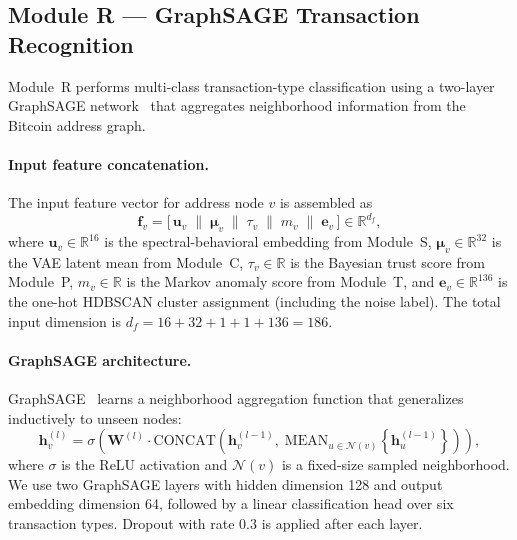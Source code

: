 \subsection{Module R — GraphSAGE Transaction Recognition}
\label{sec:module_r}

Module~R performs multi-class transaction-type classification using a
two-layer GraphSAGE network~\cite{hamilton2017inductive} that aggregates
neighborhood information from the Bitcoin address graph.

\paragraph{Input feature concatenation.}
The input feature vector for address node $v$ is assembled as
\begin{equation}
  \mathbf{f}_v =
    \bigl[\,
      \mathbf{u}_v \;\|\;
      \boldsymbol{\mu}_v \;\|\;
      \tau_v \;\|\;
      m_v \;\|\;
      \mathbf{e}_v
    \,\bigr]
    \in \mathbb{R}^{d_f},
  \label{eq:feat_concat}
\end{equation}
where $\mathbf{u}_v \in \mathbb{R}^{16}$ is the spectral-behavioral embedding
from Module~S, $\boldsymbol{\mu}_v \in \mathbb{R}^{32}$ is the VAE latent
mean from Module~C, $\tau_v \in \mathbb{R}$ is the Bayesian trust score from
Module~P, $m_v \in \mathbb{R}$ is the Markov anomaly score from Module~T, and
$\mathbf{e}_v \in \mathbb{R}^{136}$ is the one-hot HDBSCAN cluster assignment
(including the noise label).
The total input dimension is $d_f = 16 + 32 + 1 + 1 + 136 = 186$.

\paragraph{GraphSAGE architecture.}
GraphSAGE~\cite{hamilton2017inductive} learns a neighborhood aggregation
function that generalizes inductively to unseen nodes:
\begin{equation}
  \mathbf{h}_v^{(l)}
    = \sigma\!\left(
        \mathbf{W}^{(l)}
        \cdot
        \mathrm{CONCAT}\!\left(
          \mathbf{h}_v^{(l-1)},\;
          \mathrm{MEAN}_{u \in \mathcal{N}(v)}\!\left\{
            \mathbf{h}_u^{(l-1)}
          \right\}
        \right)
      \right),
  \label{eq:graphsage}
\end{equation}
where $\sigma$ is the ReLU activation and $\mathcal{N}(v)$ is a fixed-size
sampled neighborhood.
We use two GraphSAGE layers with hidden dimension 128 and output embedding
dimension 64, followed by a linear classification head over six transaction
types.
Dropout with rate $0.3$ is applied after each layer.


